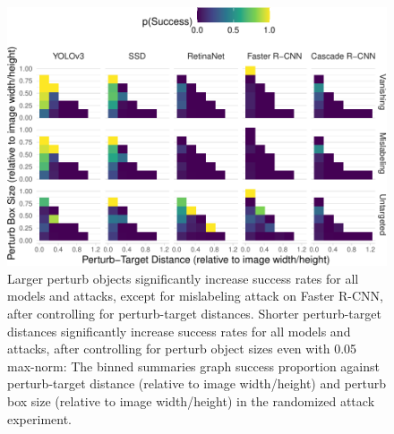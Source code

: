 \documentclass[
]{article}
\begin{document}
\begin{figure}[tb]

{\centering \includegraphics{imgs-normed/perturb_bbox_and_object_dist_graph-1} 

}

\caption{Larger perturb objects significantly increase success rates for all models and attacks, except for mislabeling attack on Faster R-CNN, after controlling for perturb-target distances. Shorter perturb-target distances significantly increase success rates for all models and attacks, after controlling for perturb object sizes even with 0.05 max-norm:  The binned summaries graph success proportion against perturb-target distance (relative to image width/height) and perturb box size (relative to image width/height) in the randomized attack experiment.}\label{fig:perturb_bbox_and_object_dist_graph}
\end{figure}

\begingroup\fontsize{9}{11}\selectfont
\end{document}
